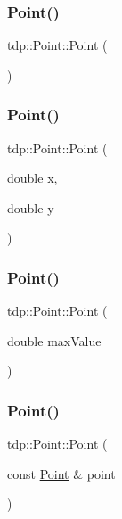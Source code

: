\subsubsection{\texorpdfstring{Point()}{Point()}\hspace{0.1cm}{\footnotesize\ttfamily [1/4]}}
{\footnotesize\ttfamily tdp\+::\+Point\+::\+Point (\begin{DoxyParamCaption}{ }\end{DoxyParamCaption})}

\mbox{\label{structtdp_1_1_point_ab713435b69e5d6cfe3704739cf2eef1e}} 
\subsubsection{\texorpdfstring{Point()}{Point()}\hspace{0.1cm}{\footnotesize\ttfamily [2/4]}}
{\footnotesize\ttfamily tdp\+::\+Point\+::\+Point (\begin{DoxyParamCaption}\item[{double}]{x,  }\item[{double}]{y }\end{DoxyParamCaption})}

\mbox{\label{structtdp_1_1_point_a37a23b239ed2dcc7b803fb851b1c4c11}} 
\subsubsection{\texorpdfstring{Point()}{Point()}\hspace{0.1cm}{\footnotesize\ttfamily [3/4]}}
{\footnotesize\ttfamily tdp\+::\+Point\+::\+Point (\begin{DoxyParamCaption}\item[{double}]{max\+Value }\end{DoxyParamCaption})}

\mbox{\label{structtdp_1_1_point_af13c65c1b6d9a0cd1d5360eb29c8e1ce}} 
\subsubsection{\texorpdfstring{Point()}{Point()}\hspace{0.1cm}{\footnotesize\ttfamily [4/4]}}
{\footnotesize\ttfamily tdp\+::\+Point\+::\+Point (\begin{DoxyParamCaption}\item[{const \mbox{\hyperlink{structtdp_1_1_point}{Point}} \&}]{point }\end{DoxyParamCaption})}



